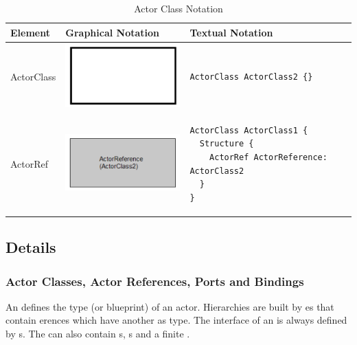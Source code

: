 \begin{table}
\caption{Actor Class Notation}
\begin{tabular}{|l|l|l|}
\hline
 \textbf{Element} & \textbf{Graphical Notation} & \textbf{Textual Notation} \\ \hline
  ActorClass & 
  \includegraphics[scale=0.7]{images/040-ActorClassNotation.png} & 
  \begin{lstlisting}
ActorClass ActorClass2 {}
  \end{lstlisting}
\\ \hline
  ActorRef & \includegraphics[scale=0.7]{images/040-ActorReferenceNotation.png} & 
  \begin{lstlisting}[language=ROOM]
ActorClass ActorClass1 {
  Structure {
    ActorRef ActorReference: ActorClass2
  }
}
  \end{lstlisting}
\\ \hline
\end{tabular}
\end{table}


\subsection{Details}

\subsubsection*{Actor Classes, Actor References, Ports and Bindings}

An  defines the type (or blueprint) of an actor. Hierarchies are built by es
that contain erences which have another  as type. The interface of an 
 is always defined by s. The  can also contain
s, s
and a finite . 

